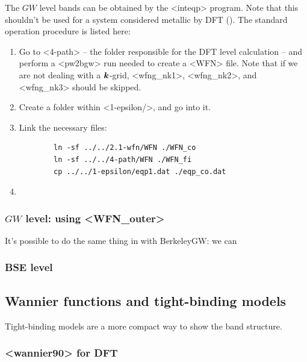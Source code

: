 \documentclass[hyperref, a4paper]{report}
\def\texttt#1{<#1>}%
\newcommand{\shortcode}[1]{\texttt{#1}}
\begin{document}
The $GW$ level bands can be obtained by the \shortcode{inteqp} program.
Note that this shouldn't be used for a system 
considered metallic by DFT ().
The standard operation procedure is listed here:
\begin{enumerate}
    \item Go to \shortcode{4-path} -- the folder responsible for the DFT level calculation --
    and perform a \shortcode{pw2bgw} run needed to create a \shortcode{WFN} file.
    Note that if we are not dealing with a $\vb*{k}$-grid,
    \shortcode{wfng_nk1}, \shortcode{wfng_nk2}, and \shortcode{wfng_nk3}
    should be skipped.
    \item Create a folder within \shortcode{1-epsilon/},
    and go into it.
    \item Link the necessary files:
    \begin{lstlisting}
        ln -sf ../../2.1-wfn/WFN ./WFN_co
        ln -sf ../../4-path/WFN ./WFN_fi
        cp ../../1-epsilon/eqp1.dat ./eqp_co.dat
    \end{lstlisting}
    \item 
\end{enumerate}

\subsubsection{$GW$ level: using \shortcode{WFN_outer}}

It's possible to do the same thing in  
with BerkeleyGW:
we can 

\subsubsection{BSE level}

\subsection{Wannier functions and tight-binding models}

Tight-binding models are a more compact way to show the band structure.

\subsubsection{\shortcode{wannier90} for DFT}
\end{document}
